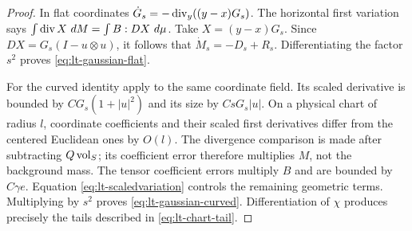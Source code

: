 \begin{proof}
In flat coordinates $\dot G_s=-\operatorname{div}_y((y-x)G_s)$.  The horizontal first
variation says $\int\operatorname{div} X\,\mathop{}\!d M=\int B:DX\,\mathop{}\!d\mu$.
Take $X=(y-x)G_s$.  Since
$DX=G_s(I-u\otimes u)$, it follows that
$\dot M_s=-D_s+R_s$.  Differentiating the factor $s^2$ proves
\eqref{eq:lt-gaussian-flat}.

For the curved identity apply  to the same
coordinate field.  Its scaled derivative is bounded by
$CG_s(1+|u|^2)$ and its size by $CsG_s|u|$.
On a physical chart of radius $l$, coordinate coefficients and their
scaled first derivatives differ from the centered Euclidean ones by
$O(l)$.  The divergence comparison is made after subtracting
$Q\operatorname{vol}_S$; its coefficient error therefore multiplies $M$, not the
background mass.  The tensor coefficient errors multiply $B$ and are
bounded by $C\gamma e$.  Equation \eqref{eq:lt-scaledvariation} controls
the remaining geometric terms.  Multiplying by $s^2$ proves
\eqref{eq:lt-gaussian-curved}.  Differentiation of $\chi$ produces precisely
the tails described in \eqref{eq:lt-chart-tail}.
\end{proof}

